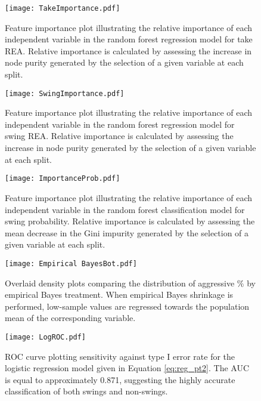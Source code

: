 \documentclass[12pt]{article}
\numberwithin{equation}{section}
\begin{document}
\begin{figure}[H]
    \centering
    \texttt{[image: TakeImportance.pdf]}
    \captionsetup{font=small, width=0.9\linewidth}
    \caption{Feature importance plot illustrating the relative importance of each independent variable in the random forest regression model for take REA. Relative importance is calculated by assessing the increase in node purity generated by the selection of a given variable at each split.}
    \label{fig:ImportanceTakeREAModel}
\end{figure}

\begin{figure}[H]
    \centering
    \texttt{[image: SwingImportance.pdf]}
    \captionsetup{font=small, width=0.9\linewidth}
    \caption{Feature importance plot illustrating the relative importance of each independent variable in the random forest regression model for swing REA. Relative importance is calculated by assessing the increase in node purity generated by the selection of a given variable at each split.}
    \label{fig:ImportanceSwingREAModel}
\end{figure}

\begin{figure}[H]
    \centering
    \texttt{[image: ImportanceProb.pdf]}
    \captionsetup{font=small, width=0.9\linewidth}
    \caption{Feature importance plot illustrating the relative importance of each independent variable in the random forest classification model for swing probability. Relative importance is calculated by assessing the mean decrease in the Gini impurity generated by the selection of a given variable at each split.}
    \label{fig:ImportanceSwingProbModel}
\end{figure}

\begin{figure}[H]
    \centering
    \texttt{[image: Empirical BayesBot.pdf]}
    \captionsetup{font=small, width=0.9\linewidth}
    \caption{Overlaid density plots comparing the distribution of aggressive $\%$ by empirical Bayes treatment. When empirical Bayes shrinkage is performed, low-sample values are regressed towards the population mean of the corresponding variable.}
    \label{fig:EBShrinkage}
\end{figure}

\begin{figure}[H]
    \centering
    \texttt{[image: LogROC.pdf]}
    \captionsetup{font=small, width=0.9\linewidth}
    \caption{ROC curve plotting sensitivity against type I error rate for the logistic regression model given in Equation \ref{eq:reg_pt2}. The AUC is equal to approximately 0.871, suggesting the highly accurate classification of both swings and non-swings.}
    \label{fig:LogROC}
\end{figure}
\end{document}
